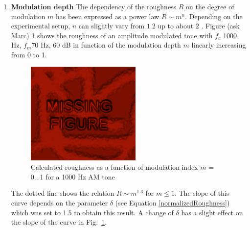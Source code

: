\begin{enumerate}
\item {\textbf{Modulation depth}}
    The dependency of the roughness $R$ on the degree of modulation
    $m$ has been expressed as a power law $R \sim m^n$. Depending on
    the experimental setup, $n$ can slightly vary from $1.2$ up to
    about $2$ \cite{Terhardt:97}. Figure (\IPEMTBC ask Marc)
    \ref{Fig:RoughnessExperimentsModulationDepth} shows the roughness of an amplitude
    modulated tone with $f_c$ 1000 Hz, $f_m$70 Hz, 60 dB in function
    of the modulation depth $m$ linearly increasing from 0 to 1.
    \begin{figure}[h]
        \centering
        \includegraphics[width=\IPEMDefaultFigureWidth]{Graphics/MissingFigure}
        \caption{Calculated roughness as a function of modulation index $m$ =
        0...1 for a 1000 Hz AM tone}\label{Fig:RoughnessExperimentsModulationDepth}
    \end{figure}
    The dotted line shows the relation $R \sim m^{1.3}$ for $m \leq
    1$. The slope of this curve depends on the parameter $\delta$
    (see Equation \ref{normalizedRoughness}) which was set to 1.5 to obtain
    this result. A change of $\delta$ has a slight effect on the
    slope of the curve in Fig.~\ref{Fig:RoughnessExperimentsModulationDepth}.


\end{enumerate}

